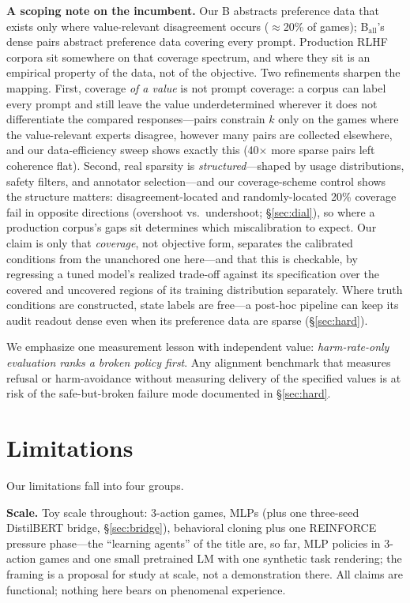 \documentclass[manuscript, screen, review]{jair}
\begin{document}
\textbf{A scoping note on the incumbent.} Our B abstracts preference data that exists only where value-relevant disagreement occurs ($\approx$20\% of games); B$_{\mathrm{all}}$'s dense pairs abstract preference data covering every prompt. Production RLHF corpora sit somewhere on that coverage spectrum, and where they sit is an empirical property of the data, not of the objective. Two refinements sharpen the mapping. First, coverage \emph{of a value} is not prompt coverage: a corpus can label every prompt and still leave the value underdetermined wherever it does not differentiate the compared responses---pairs constrain $k$ only on the games where the value-relevant experts disagree, however many pairs are collected elsewhere, and our data-efficiency sweep shows exactly this (40$\times$ more sparse pairs left coherence flat). Second, real sparsity is \emph{structured}---shaped by usage distributions, safety filters, and annotator selection---and our coverage-scheme control shows the structure matters: disagreement-located and randomly-located 20\% coverage fail in opposite directions (overshoot vs.\ undershoot; \S\ref{sec:dial}), so where a production corpus's gaps sit determines which miscalibration to expect. Our claim is only that \emph{coverage}, not objective form, separates the calibrated conditions from the unanchored one here---and that this is checkable, by regressing a tuned model's realized trade-off against its specification over the covered and uncovered regions of its training distribution separately. Where truth conditions are constructed, state labels are free---a post-hoc pipeline can keep its audit readout dense even when its preference data are sparse (\S\ref{sec:hard}).

We emphasize one measurement lesson with independent value: \emph{harm-rate-only evaluation ranks a broken policy first}. Any alignment benchmark that measures refusal or harm-avoidance without measuring delivery of the specified values is at risk of the safe-but-broken failure mode documented in \S\ref{sec:hard}.

\section{Limitations}
\label{sec:limitations}

Our limitations fall into four groups.

\textbf{Scale.} Toy scale throughout: 3-action games, MLPs (plus one three-seed DistilBERT bridge, \S\ref{sec:bridge}), behavioral cloning plus one REINFORCE pressure phase---the ``learning agents'' of the title are, so far, MLP policies in 3-action games and one small pretrained LM with one synthetic task rendering; the framing is a proposal for study at scale, not a demonstration there. All claims are functional; nothing here bears on phenomenal experience.
\end{document}
